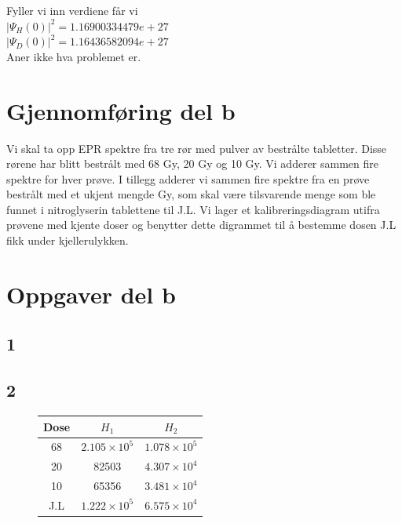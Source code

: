 \documentclass[a4paper, 12pt]{article}
\begin{document}
Fyller vi inn verdiene får vi \\
$|\Psi_H (0)|^2 = 1.16900334479e+27$\\
$|\Psi_D (0)|^2 = 1.16436582094e+27$\\
Aner ikke hva problemet er.
\section{Gjennomføring del b}
Vi skal ta opp EPR spektre fra tre rør med pulver av bestrålte tabletter. Disse rørene har blitt bestrålt med 68 Gy, 20 Gy og 10 Gy. Vi adderer sammen fire spektre for hver prøve. I tillegg adderer vi sammen fire spektre fra en prøve bestrålt med et ukjent mengde Gy, som skal være tilsvarende menge som ble funnet i nitroglyserin tablettene til J.L. Vi lager et kalibreringsdiagram utifra prøvene med kjente doser og benytter dette digrammet til å bestemme dosen J.L fikk under kjellerulykken.

\section{Oppgaver del b}
\subsection*{1}
\subsection*{2}
\begin{figure}[H]
\centering
\begin{tabular}{|c|c|c|}
\hline
Dose & $H_1$ & $H_2$\\
\hline
68 & $2.105\times 10^5$ & $1.078 \times 10^{5}$\\
20 & 82503 & $4.307\times 10^{4}$\\
10 & 65356 & $3.481\times 10^{4}$\\
J.L & $1.222\times 10^{5}$ & $6.575\times 10^{4}$\\
\hline
\end{tabular}
\end{figure}
\end{document}
